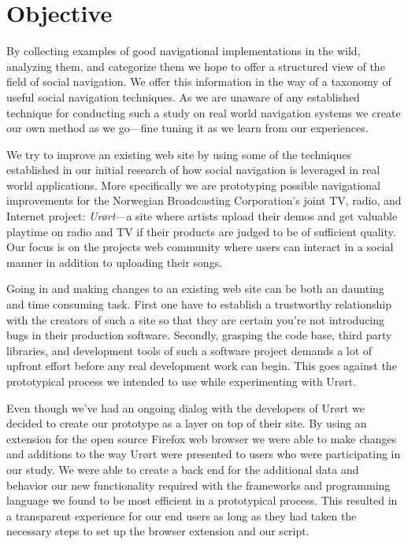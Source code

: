 \section{Objective}

By collecting examples of good navigational implementations in the wild,
analyzing them, and categorize them we hope to offer a structured view of the
field of social navigation. We offer this information in the way of a taxonomy
of useful social navigation techniques.
As we are unaware of any established technique for
conducting such a study on real world navigation systems we create our own
method as we go---fine tuning it as we learn from our experiences.

We try to improve an existing web site by using some of the techniques
established in our initial research of how social navigation is leveraged
in real world applications. More specifically we are prototyping possible
navigational improvements for the Norwegian Broadcasting Corporation's joint
TV, radio, and Internet project: \emph{Ur\o{}rt}---a site where artists upload
their demos and get valuable playtime on radio and TV if their products are
judged to be of sufficient quality. Our focus is on the projects
web community%
where users can interact in a social manner in addition to uploading
their songs.

Going in and making changes to an existing web site can be both an
daunting and time consuming task. First one have to establish a trustworthy
relationship with the creators of such a site so that they are certain
you're not introducing bugs in their production software. Secondly, grasping the
code base, third party libraries, and development tools of such a software
project demands a lot of upfront effort before any real development work can
begin. This goes against the prototypical process we intended to use while
experimenting with Ur\o{}rt.

Even though we've had an ongoing dialog with the developers of Ur\o{}rt we
decided to create our prototype as a layer on top of their site. By using an
extension%
for the open source Firefox%
web browser we were able to make changes and additions to the way Ur\o{}rt were
presented to users who were participating in our study. We were able to create
a back end for the additional data and behavior our new functionality required
with the frameworks and programming language we found to be most efficient in
a prototypical process. This resulted in a transparent experience for our end
users as long as they had taken the necessary steps to set up the browser
extension and our script.


